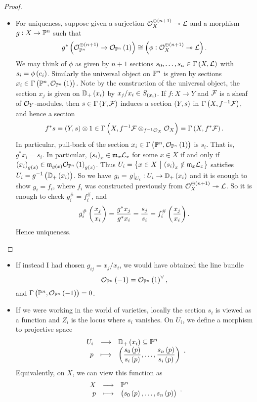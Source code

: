 \begin{proof}
\begin{itemize}
\begin{itemize}
\item For uniqueness, suppose given a surjection $ \OOO_X^{\oplus \br{n + 1}} \twoheadrightarrow \LLL $ and a morphism $ g : X \to \mathbb{P}^n $ such that
$$ g^*\br{\OOO_{\PP^n}^{\oplus \br{n + 1}} \to \OOO_{\PP^n}\br{1}} \cong \br{\phi : \OOO_X^{\oplus \br{n + 1}} \twoheadrightarrow \LLL}. $$
We may think of $ \phi $ as given by $ n + 1 $ sections $ s_0, \dots, s_n \in \Gamma\br{X, \LLL} $ with $ s_i = \phi\br{e_i} $. Similarly the universal object on $ \mathbb{P}^n $ is given by sections $ x_i \in \Gamma\br{\PP^n, \OOO_{\PP^n}\br{1}} $. Note by the construction of the universal object, the section $ x_j $ is given on $ \DD_+\br{x_i} $ by $ x_j / x_i \in S_{\br{x_i}} $. If $ f : X \to Y $ and $ \mathcal{F} $ is a sheaf of $ \mathcal{O}_Y $-modules, then $ s \in \Gamma\br{Y, \FFF} $ induces a section $ \br{Y, s} $ in $ \Gamma\br{X, f^{-1}\FFF} $, and hence a section
$$ f^*s = \br{Y, s} \otimes 1 \in \Gamma\br{X, f^{-1}\FFF \otimes_{f^{-1}\OOO_X} \OOO_X} = \Gamma\br{X, f^*\FFF}. $$
In particular, pull-back of the section $ x_i \in \Gamma\br{\PP^n, \OOO_{\PP^n}\br{1}} $ is $ s_i $. That is, $ g^*x_i = s_i $. In particular, $ \br{s_i}_x \in \mmm_x\LLL_x $ for some $ x \in X $ if and only if $ \br{x_i}_{g\br{x}} \in \mmm_{g\br{x}}\OOO_{\PP^n}\br{1}_{g\br{x}} $. Thus $ U_i = \cbr{x \in X \st \br{s_i}_x \notin \mmm_x\LLL_x} $ satisfies $ U_i = g^{-1}\br{\DD_+\br{x_i}} $. So we have $ g_i = \eval{g}_{U_i} : U_i \to \DD_+\br{x_i} $ and it is enough to show $ g_i = f_i $, where $ f_i $ was constructed previously from $ \OOO_X^{\oplus \br{n + 1}} \twoheadrightarrow \LLL $. So it is enough to check $ g_i^\# = f_i^\# $, and
$$ g_i^\#\br{\dfrac{x_j}{x_i}} = \dfrac{g^*x_j}{g^*x_i} = \dfrac{s_j}{s_i} = f_i^\#\br{\dfrac{x_j}{x_i}}. $$
Hence uniqueness.
\end{itemize}
\end{itemize}
\end{proof}

\begin{remark*}
\hfill
\begin{itemize}
\item If instead I had chosen $ g_{ij} = x_j / x_i $, we would have obtained the line bundle
$$ \OOO_{\PP^n}\br{-1} = \OOO_{\PP^n}\br{1}^\vee, $$
and $ \Gamma\br{\PP^n, \OOO_{\PP^n}\br{-1}} = 0 $.
\item If we were working in the world of varieties, locally the section $ s_i $ is viewed as a function and $ Z_i $ is the locus where $ s_i $ vanishes. On $ U_i $, we define a morphism to projective space
$$ \function{U_i}{\DD_+\br{x_i} \subseteq \PP^n}{p}{\br{\dfrac{s_0\br{p}}{s_i\br{p}}, \dots, \dfrac{s_n\br{p}}{s_i\br{p}}}}. $$
Equivalently, on $ X $, we can view this function as
$$ \function{X}{\PP^n}{p}{\br{s_0\br{p}, \dots, s_n\br{p}}}. $$
\end{itemize}
\end{remark*}

